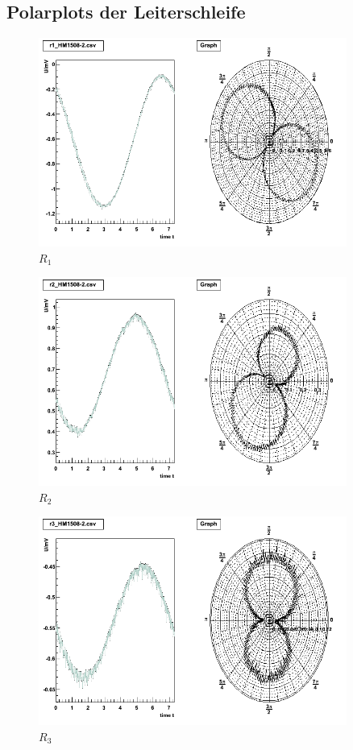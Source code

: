 \begin{appendix}
\section{Polarplots der Leiterschleife}

\begin{figure}[H]
	\centering \includegraphics[width=0.9\textwidth]{Auswertung/widerstaende-polar/r1.png}
	\caption{$R_1$}
\end{figure}

\begin{figure}[H]
	\centering \includegraphics[width=0.9\textwidth]{Auswertung/widerstaende-polar/r2.png}
	\caption{$R_2$}
\end{figure}

\begin{figure}[H]
	\centering \includegraphics[width=0.9\textwidth]{Auswertung/widerstaende-polar/r3.png}
	\caption{$R_3$}
\end{figure}


\end{appendix}
